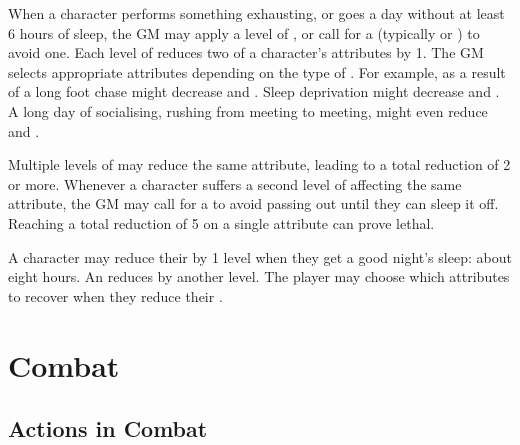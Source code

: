When a character performs something exhausting, or goes a day without at least 6 hours of sleep, the GM may apply a level of {\exhaustion}, or call for a {\test} (typically  or ) to avoid one.
Each level of {\exhaustion} reduces two of a character's attributes by 1.
The GM selects appropriate attributes depending on the type of {\exhaustion}.
For example, {\exhaustion} as a result of a long foot chase might decrease  and .
Sleep deprivation might decrease  and .
A long day of socialising, rushing from meeting to meeting, might even reduce  and .

Multiple levels of {\exhaustion} may reduce the same attribute, leading to a total reduction of 2 or more.
Whenever a character suffers a second level of {\exhaustion} affecting the same attribute, the GM may call for a {\test} to avoid passing out until they can sleep it off.
Reaching a total reduction of 5 on a single attribute can prove lethal.

A character may reduce their {\exhaustion} by 1 level when they get a good night's sleep: about eight hours.
An {\dayofrest} reduces {\exhaustion} by another level.
The player may choose which attributes to recover when they reduce their {\exhaustion}.

\section{Combat}

\subsection{Actions in Combat}


